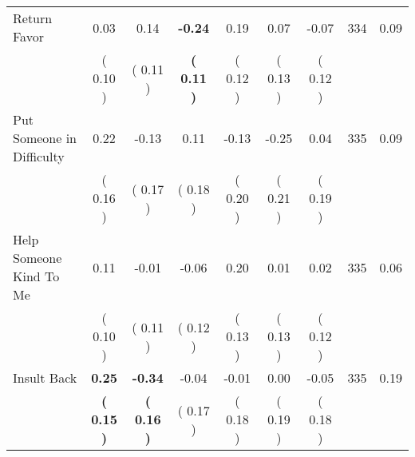 \begin{tabular}{lcccccccc}
Return Favor &      0.03 &      0.14 & \textbf{    -0.24} &      0.19 &      0.07 &     -0.07 & 334 &       0.09 \\ 
 & (     0.10 ) & (     0.11 ) & \textbf{(     0.11 )} & (     0.12 ) & (     0.13 ) & (     0.12 ) & \\
Put Someone in Difficulty &      0.22 &     -0.13 &      0.11 &     -0.13 &     -0.25 &      0.04 & 335 &       0.09 \\ 
 & (     0.16 ) & (     0.17 ) & (     0.18 ) & (     0.20 ) & (     0.21 ) & (     0.19 ) & \\
Help Someone Kind To Me &      0.11 &     -0.01 &     -0.06 &      0.20 &      0.01 &      0.02 & 335 &       0.06 \\ 
 & (     0.10 ) & (     0.11 ) & (     0.12 ) & (     0.13 ) & (     0.13 ) & (     0.12 ) & \\
Insult Back & \textbf{     0.25} & \textbf{    -0.34} &     -0.04 &     -0.01 &      0.00 &     -0.05 & 335 &       0.19 \\ 
 & \textbf{(     0.15 )} & \textbf{(     0.16 )} & (     0.17 ) & (     0.18 ) & (     0.19 ) & (     0.18 ) & \\
\bottomrule
\end{tabular}
